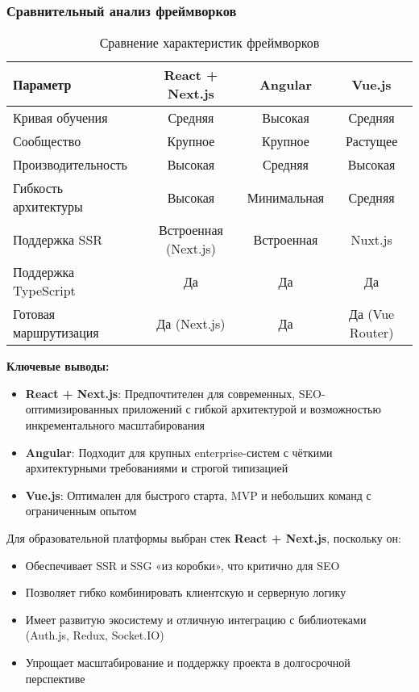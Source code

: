 \subsubsection{Сравнительный анализ фреймворков}

\begin{table}[h]
\centering
\caption{Сравнение характеристик фреймворков}
\begin{tabular}{|l|c|c|c|}
\hline
\textbf{Параметр}         & React + Next.js & Angular  & Vue.js   \\ \hline
Кривая обучения           & Средняя         & Высокая  & Средняя  \\ \hline
Сообщество                & Крупное         & Крупное  & Растущее \\ \hline
Производительность        & Высокая         & Средняя  & Высокая  \\ \hline
Гибкость архитектуры      & Высокая         & Минимальная & Средняя  \\ \hline
Поддержка SSR             & Встроенная (Next.js) & Встроенная & Nuxt.js \\ \hline
Поддержка TypeScript      & Да              & Да       & Да       \\ \hline
Готовая маршрутизация     & Да (Next.js)    & Да       & Да (Vue Router) \\ \hline
\end{tabular}
\end{table}

\textbf{Ключевые выводы:}
\begin{itemize}
\item \textbf{React + Next.js}: Предпочтителен для современных, SEO-оптимизированных приложений с гибкой архитектурой и возможностью инкрементального масштабирования
\item \textbf{Angular}: Подходит для крупных enterprise-систем с чёткими архитектурными требованиями и строгой типизацией
\item \textbf{Vue.js}: Оптимален для быстрого старта, MVP и небольших команд с ограниченным опытом
\end{itemize}

Для образовательной платформы выбран стек \textbf{React + Next.js}, поскольку он:
\begin{itemize}
\item Обеспечивает SSR и SSG «из коробки», что критично для SEO
\item Позволяет гибко комбинировать клиентскую и серверную логику
\item Имеет развитую экосистему и отличную интеграцию с библиотеками (Auth.js, Redux, Socket.IO)
\item Упрощает масштабирование и поддержку проекта в долгосрочной перспективе
\end{itemize}


